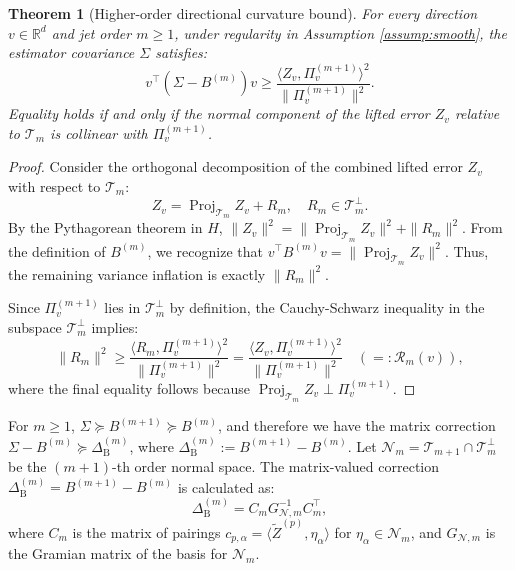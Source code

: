 \documentclass[pdflatex,sn-mathphys-num]{sn-jnl}%
\theoremstyle{thmstyleone}%
\newtheorem{theorem}{Theorem}%
\theoremstyle{thmstyletwo}%
\theoremstyle{thmstylethree}%
\begin{document}
\begin{theorem}[Higher-order directional curvature bound]
For every direction $v \in \mathbb{R}^d$ and jet order $m \ge 1$, under regularity in Assumption \ref{assump:smooth}, the estimator covariance $\Sigma$ satisfies:
\begin{equation}
\label{eq:high_order_dir}
v^\top (\Sigma - B^{(m)}) v \ge \frac{\langle Z_v, \Pi_v^{(m+1)} \rangle^2}{\|\Pi_v^{(m+1)}\|^2}.
\end{equation}
Equality holds if and only if the normal component of the lifted error $Z_v$ relative to $\mathcal{T}_m$ is collinear with $\Pi_v^{(m+1)}$.
\label{thm:hor}
\end{theorem}

\begin{proof}
Consider the orthogonal decomposition of the combined lifted error $Z_v$ with respect to $\mathcal{T}_m$:
\[
Z_v = \operatorname{Proj}_{\mathcal{T}_m} Z_v + R_m, \quad R_m \in \mathcal{T}_m^\perp.
\]
By the Pythagorean theorem in $H$, $\|Z_v\|^2 = \|\operatorname{Proj}_{\mathcal{T}_m} Z_v\|^2 + \|R_m\|^2$. From the definition of $B^{(m)}$, we recognize that $v^\top B^{(m)} v = \|\operatorname{Proj}_{\mathcal{T}_m} Z_v\|^2$. Thus, the remaining variance inflation is exactly $\|R_m\|^2$. 

Since $\Pi_v^{(m+1)}$ lies in $\mathcal{T}_m^\perp$ by definition, the Cauchy-Schwarz inequality in the subspace $\mathcal{T}_m^\perp$ implies:
\[
\|R_m\|^2 \ge \frac{\langle R_m, \Pi_v^{(m+1)} \rangle^2}{\|\Pi_v^{(m+1)}\|^2} = \frac{\langle Z_v, \Pi_v^{(m+1)} \rangle^2}{\|\Pi_v^{(m+1)}\|^2}\quad (=:\mathcal{R}_m(v)),
\]
where the final equality follows because $\operatorname{Proj}_{\mathcal{T}_m} Z_v \perp \Pi_v^{(m+1)}$.
\end{proof}

For \(m\geq 1\), $\Sigma\succeq B^{(m+1)} \succeq B^{(m)}$, and therefore we have the matrix correction \(\Sigma-B^{(m)}\succeq \Delta^{(m)}_{\mathrm{B}}\), where \(\Delta^{(m)}_{\mathrm{B}}:= B^{(m+1)} - B^{(m)}\). Let $\mathcal{N}_m = \mathcal{T}_{m+1} \cap \mathcal{T}_m^\perp$ be the $(m+1)$-th order normal space. The matrix-valued correction $\Delta^{(m)}_{\mathrm{B}} = B^{(m+1)} - B^{(m)}$ is calculated as:
\[
\Delta^{(m)}_{\mathrm{B}} = C_m G_{\mathcal{N},m}^{-1} C_m^\top,
\]
where $C_m$ is the matrix of pairings $c_{p,\alpha} = \langle \widetilde{Z}^{(p)}, \eta_\alpha \rangle$ for $\eta_\alpha \in \mathcal{N}_m$, and $G_{\mathcal{N},m}$ is the Gramian matrix of the basis for $\mathcal{N}_m$.
\end{document}
